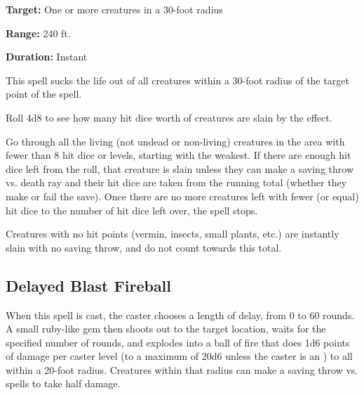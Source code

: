 \begin{multicols*}{2}
{\textbf{Target:} One or more creatures in a 30-foot radius

\textbf{Range:} 240 ft.

\textbf{Duration:} Instant}

This spell sucks the life out of all creatures within a 30-foot radius of the target point of the spell.

Roll 4d8 to see how many hit dice worth of creatures are slain by the effect.

Go through all the living (not undead or non-living) creatures in the area with fewer than 8 hit dice or levels, starting with the weakest. If there are enough hit dice left from the roll, that creature is slain unless they can make a saving throw vs. death ray and their hit dice are taken from the running total (whether they make or fail the save). Once there are no more creatures left with fewer (or equal) hit dice to the number of hit dice left over, the spell stops.


Creatures with no hit points (vermin, insects, small plants, etc.) are instantly slain with no saving throw, and do not count towards this total.

\subsection{Delayed Blast Fireball}\label{spell:Delayed Blast Fireball}

When this spell is cast, the caster chooses a length of delay, from 0 to 60 rounds. A small ruby-like gem then shoots out to the target location, waits for the specified number of rounds, and explodes into a ball of fire that does 1d6 points of damage per caster level (to a maximum of 20d6 unless the caster is an ) to all within a 20-foot radius. Creatures within that radius can make a saving throw vs. spells to take half damage.


\end{multicols*}
